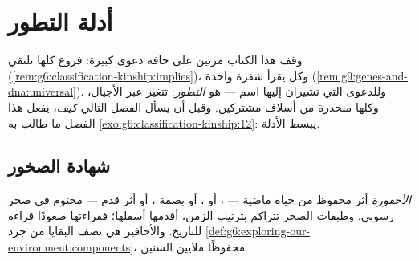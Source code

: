 \chapter{أدلة التطور}\label{ch:g9:evidence-of-evolution}

وقف هذا الكتاب مرتين على حافة دعوى كبيرة: فروع  كلها تلتقي
(\cref{rem:g6:classification-kinship:implies})، وكل  يقرأ شفرة واحدة
(\cref{rem:g9:genes-and-dna:universal}). وللدعوى التي
تشيران إليها اسم --- هو \emph{التطور}:  تتغير عبر
الأجيال، وكلها منحدرة من أسلاف مشتركين. وقبل أن يسأل
الفصل التالي \emph{كيف}، يفعل هذا الفصل ما طالب به
\cref{exo:g6:classification-kinship:12}: يبسط الأدلة.

\section{شهادة الصخور}

\begin{definition}[الأحافير]\label{def:g9:evidence-of-evolution:fossils}
\emph{الأحفورة} أثر محفوظ من حياة ماضية ---
، أو ، أو بصمة ، أو أثر قدم --- مختوم في صخر
رسوبي. وطبقات الصخر تتراكم بترتيب الزمن، أقدمها أسفلها؛
فقراءتها صعودًا قراءة للتاريخ. والأحافير هي نصف البقايا
من جرد
\cref{def:g6:exploring-our-environment:components}،
محفوظًا ملايين السنين.
\end{definition}

